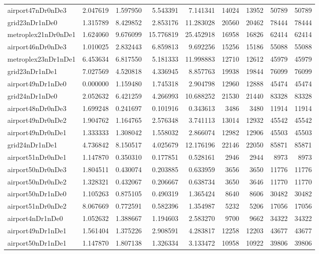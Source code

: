 \begin{longtable}{|l|r|r|r|r|r|r|r|r|}
airport47nDr0nDe3 & 2.047619 & 1.597950 & 5.543391 & 7.141341 & 14024 & 13952 & 50789 & 50789 \\
grid23nDr1nDe0 & 1.315789 & 8.429852 & 2.853176 & 11.283028 & 20560 & 20462 & 78444 & 78444 \\
metroplex21nDr0nDe1 & 1.624060 & 9.676099 & 15.776819 & 25.452918 & 16958 & 16826 & 62414 & 62414 \\
airport46nDr0nDe3 & 1.010025 & 2.832443 & 6.859813 & 9.692256 & 15256 & 15186 & 55088 & 55088 \\
metroplex23nDr1nDe1 & 6.453634 & 6.817550 & 5.181333 & 11.998883 & 12710 & 12612 & 45979 & 45979 \\
grid23nDr1nDe1 & 7.027569 & 4.520818 & 4.336945 & 8.857763 & 19938 & 19844 & 76099 & 76099 \\
airport49nDr1nDe0 & 0.000000 & 1.159480 & 1.745318 & 2.904798 & 12960 & 12888 & 45474 & 45474 \\
grid24nDr1nDe0 & 2.052632 & 6.421259 & 4.266993 & 10.688252 & 21530 & 21440 & 83328 & 83328 \\
airport48nDr0nDe3 & 1.699248 & 0.241697 & 0.101916 & 0.343613 & 3486 & 3480 & 11914 & 11914 \\
airport49nDr0nDe2 & 1.904762 & 1.164765 & 2.576348 & 3.741113 & 13014 & 12932 & 45542 & 45542 \\
airport49nDr0nDe1 & 1.333333 & 1.308042 & 1.558032 & 2.866074 & 12982 & 12906 & 45503 & 45503 \\
grid24nDr1nDe1 & 4.736842 & 8.150517 & 4.025679 & 12.176196 & 22146 & 22050 & 85871 & 85871 \\
airport51nDr0nDe1 & 1.147870 & 0.350310 & 0.177851 & 0.528161 & 2946 & 2944 & 8973 & 8973 \\
airport50nDr0nDe3 & 1.804511 & 0.430074 & 0.203885 & 0.633959 & 3656 & 3650 & 11776 & 11776 \\
airport50nDr0nDe2 & 1.328321 & 0.432067 & 0.206667 & 0.638734 & 3650 & 3646 & 11770 & 11770 \\
airport50nDr1nDe0 & 1.105263 & 0.875105 & 0.490319 & 1.365424 & 8640 & 8606 & 30482 & 30482 \\
airport51nDr0nDe2 & 8.067669 & 0.772591 & 0.582396 & 1.354987 & 5232 & 5206 & 17056 & 17056 \\
airport4nDr1nDe0 & 1.052632 & 1.388667 & 1.194603 & 2.583270 & 9700 & 9662 & 34322 & 34322 \\
airport49nDr1nDe1 & 1.561404 & 1.375226 & 2.908591 & 4.283817 & 12258 & 12203 & 43677 & 43677 \\
airport50nDr1nDe1 & 1.147870 & 1.807138 & 1.326334 & 3.133472 & 10958 & 10922 & 39806 & 39806 \\

\end{longtable}
